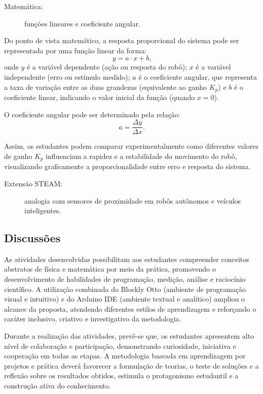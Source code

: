 \documentclass[portuguese]{textolivre}
\begin{document}
\begin{description}
    \item[Matemática:]  funções lineares e coeficiente angular.
\end{description}

Do ponto de vista matemático, a resposta proporcional do sistema pode ser representada por uma função linear da forma:
\begin{equation}
	y = a \cdot x + b \text{,}
\end{equation}
onde
$y$ é a variável dependente (ação ou resposta do robô); 
$x$ é a variável independente (erro ou estímulo medido);
$a$ é o coeficiente angular, que representa a taxa de variação entre as duas grandezas (equivalente ao ganho $K_p$) e
$b$ é o coeficiente linear, indicando o valor inicial da função (quando $x = 0$).

O coeficiente angular pode ser determinado pela relação:
\begin{equation}
	a = \frac{\Delta y}{\Delta x} .
\end{equation}

Assim, os estudantes podem comparar experimentalmente como diferentes valores de ganho $K_p$ influenciam a rapidez e a estabilidade do movimento do robô, visualizando graficamente a proporcionalidade entre erro e resposta do sistema.

\begin{description}
    \item[Extensão STEAM:] analogia com sensores de proximidade em robôs autônomos e veículos inteligentes.
\end{description}



\subsection{Discussões}

As atividades desenvolvidas possibilitam aos estudantes compreender conceitos abstratos de física e matemática por meio da prática, promovendo o desenvolvimento de habilidades de programação, medição, análise e raciocínio científico. A utilização combinada do Blockly Otto (ambiente de programação visual e intuitivo) e do Arduino IDE (ambiente textual e analítico) ampliou o alcance da proposta, atendendo diferentes estilos de aprendizagem e reforçando o caráter inclusivo, criativo e investigativo da metodologia.

Durante a realização das atividades, prevê-se que, os estudantes apresentem alto nível de colaboração e participação, demonstrando curiosidade, iniciativa e cooperação em todas as etapas. A metodologia baseada em aprendizagem por projetos e prática deverá favorecer a formulação de teorias, o teste de soluções e a reflexão sobre os resultados obtidos, estimula o protagonismo estudantil e a construção ativa do conhecimento.
\end{document}
